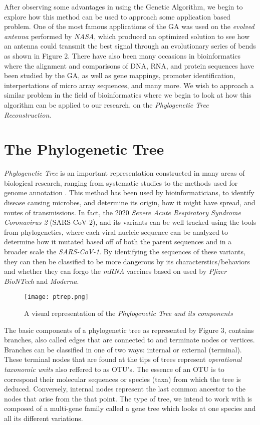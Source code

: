 After observing some advantages in using the Genetic Algorithm, we begin to explore how this method can be used to approach some application based problem. One of the most famous applications of the GA was used on the \emph{evolved antenna} performed by \emph{NASA}, which produced an optimized solution to see how an antenna could transmit the best signal through an evolutionary series of bends as shown in Figure 2. There have also been many occasions in bioinformatics where the alignment and comparisons of DNA, RNA, and protein sequences have been studied by the GA, as well as gene mappings, promoter identification, interpertations of micro array sequences, and many more. We wish to approach a similar problem in the field of bioinformatics where we begin to look at how this algorithm can be applied to our research, on the \emph{Phylogenetic Tree Reconstruction}. 

\section{The Phylogenetic Tree}

\emph{Phylogenetic Tree} is an important representation constructed in many areas of biological research, ranging from systematic studies to the methods used for genome annotation \cite{Money}. This method has been used by bioinformaticians, to identify disease causing microbes, and determine its origin, how it might have spread, and routes of transmissions. In fact, the 2020 \emph{Severe Acute Respiratory Syndrome Coronavirus 2} (SARS-CoV-2), and its variants can be well tracked using the tools from phylogenetics, where each viral nucleic sequence can be analyzed to determine how it mutated based off of both the parent sequences and in a broader scale the \emph{SARS-CoV-1}. By identifying the sequences of these variants, they can then be classified to be more dangerous by its characterstics/behaviors and whether they can forgo the \emph{mRNA} vaccines based on used by \emph{Pfizer BioNTech} and \emph{Moderna}. 

\begin{figure}[h]
\centering
\texttt{[image: ptrep.png]}
\caption{A visual representation of the \emph{Phylogenetic Tree and its components} \cite{Gupta}}
\end{figure}

The basic components of a phylogenetic tree as represented by Figure 3, contains branches, also called edges that are connected to and terminate nodes or vertices. Branches can be classified in one of two ways: internal or external (terminal). These terminal nodes that are found at the tips of trees represent \emph{operational taxonomic units} also reffered to as OTU's. The essence of an OTU is to correspond their molecular sequences or species (taxa) from which the tree is deduced. Conversely, internal nodes represent the last common ancestor to the nodes that arise from the that point. The type of tree, we intend to work with is composed of a multi-gene family called a gene tree which looks at one species and all its different variations.

